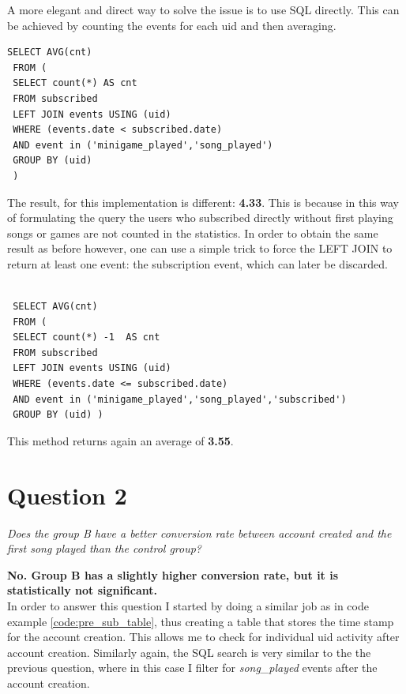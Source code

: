 \documentclass[paper=a4, fontsize=10pt]{report}
\begin{document}
A more elegant and direct way to solve the issue is to use SQL directly. This can be achieved by
counting the events for each uid and then averaging.

\footnotesize
\begin{lstlisting}[frame=single,caption=Return SQL average \label{code:sql_average_table}]
 SELECT AVG(cnt)
 FROM (  
 SELECT count(*) AS cnt
 FROM subscribed 
 LEFT JOIN events USING (uid)
 WHERE (events.date < subscribed.date)
 AND event in ('minigame_played','song_played') 
 GROUP BY (uid)
 )
\end{lstlisting}
\normalsize

The result, for this implementation is different: \textbf{4.33}. This is because in this way of
formulating the query the users who subscribed directly without first playing songs or 
games are not counted in the statistics. In order to obtain the same result as before however, 
one can use a simple trick to force the LEFT JOIN to return at least one event: the subscription event, which can 
later be discarded.

\footnotesize
\begin{lstlisting}[frame=single,caption=Return SQL average - Fixed \label{code:sql_average_fixed_table}]

 SELECT AVG(cnt)
 FROM ( 
 SELECT count(*) -1  AS cnt
 FROM subscribed 
 LEFT JOIN events USING (uid)
 WHERE (events.date <= subscribed.date)
 AND event in ('minigame_played','song_played','subscribed') 
 GROUP BY (uid) )
\end{lstlisting}
\normalsize
This method returns again an average of \textbf{3.55}.


\section*{Question 2}

\textit{Does the group B have a better conversion rate between account created and
the first song played than the control group?}

\textbf{No. Group B has a slightly higher conversion rate, but it is statistically not significant.}\\

In order to answer this question I started by doing a similar job as in code example \ref{code:pre_sub_table}, thus creating a table that stores the time stamp
for the account creation. This allows me to check for individual uid activity after account creation. Similarly again, the SQL search is very similar to the 
the previous question, where in this case I filter for \textit{song\_played} events after the account creation.
\end{document}
